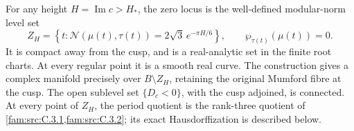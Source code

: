 \begin{proposition}\label{push:src:D.4.2}
For any height \(H=\operatorname{Im}c>H_*\), the zero locus is the
well-defined modular-norm level set
\[
 Z_H=\left\{t:\mathcal N(\mu(t),\tau(t))
                    =2\sqrt3\,e^{-\pi H/6}\right\},\qquad
 \wp_{\tau(t)}(\mu(t))=0.
\]
It is compact away from the cusp, and is a real-analytic set in the
finite root charts. At every regular point it is a smooth real curve.
The construction gives a complex manifold precisely over
\(B\setminus Z_H\), retaining the original Mumford fibre at the cusp.
The open sublevel set \(\{D_c<0\}\), with the cusp adjoined, is
connected. At every point of \(Z_H\), the period quotient is the
rank-three quotient of \cref{fam:src:C.3.1,fam:src:C.3.2}; its exact Hausdorffization is described
below.
\end{proposition}

